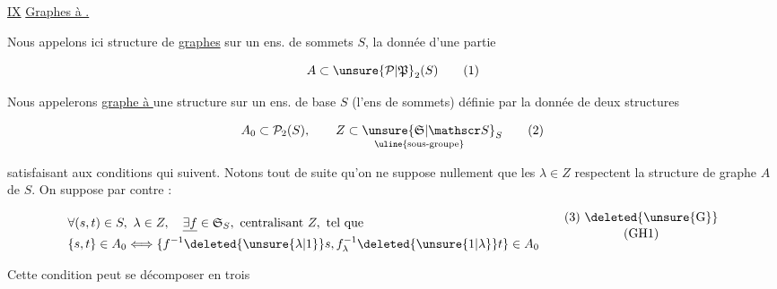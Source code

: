 
\uline{IX} \uline{Graphes à .}

Nous  appelons ici structure de \uline{graphes} sur un ens. de sommets $S$, la donnée d'une partie

\[ A\subset\unsure{\mathcal P|\mathfrak P}_2(S) \tag*{(1)} \]

Nous appelerons \uline{graphe à } une structure sur un ens. de base $S$ (l'ens de sommets) définie par la donnée de deux structures

\[ A_0\subset\mathcal P_2(S),\qquad \underset{\text{\uline{sous-groupe}}}{Z\subset\unsure{\mathfrak S|\mathscr S}_S} \tag*{(2)} \]

satisfaisant aux conditions qui suivent. Notons tout de suite qu'on ne suppose nullement que  les  $\lambda\in Z$ respectent la structure de graphe  $A$ de $S$. On suppose par contre :

\[
\begin{aligned}
 &\forall(s,t)\in S,\ \lambda\in Z,\quad \underline{\exists f}\in\mathfrak S_S,\ \text{centralisant }Z,\ \text{tel que}\\
 &\{s,t\}\in A_0\Longleftrightarrow\{f^{-1}\deleted{\unsure{\lambda|1}}s,f_{\lambda}^{-1}\deleted{\unsure{1|\lambda}}t\}\in A_0
\end{aligned}\tag*{\shortstack{(3) \deleted{\unsure{G}}\\(GH1)}}
\]

Cette condition peut se décomposer en trois

